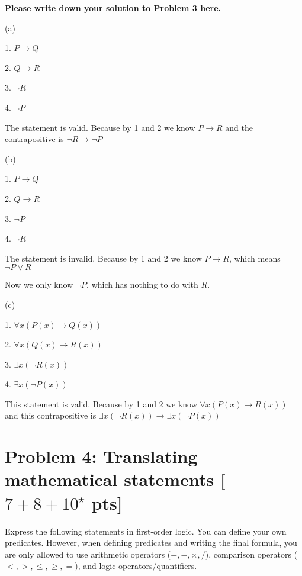 \documentclass[11pt,twoside]{article}
\newcommand{\problem}[1]{\section*{Problem #1}}
\newenvironment{solution}{{\par\noindent\it Solution.}}{}
\begin{document}
\begin{solution}
\textbf{Please write down your solution to Problem 3 here.}




    \hspace*{\fill}

    (a)
    
    1. $P\rightarrow Q$
    
    2. $Q\rightarrow R$

    3. $\neg R$

    4. $\neg P$



    The statement is valid. Because by 1 and 2 we know $P\rightarrow R$
and the contrapositive is $ \neg R\rightarrow \neg P$




    \hspace*{\fill}

    (b)
    
    1. $P\rightarrow Q$
    
    2. $Q\rightarrow R$

    3. $\neg P$

    4. $\neg R$



    The statement is invalid. Because by 1 and 2 we know $P\rightarrow R$, which means $\neg P \lor R$

    Now we only know $\neg P$, which has nothing to do with $R$.
    

    \hspace*{\fill}

    
    (c)

    1. $\forall x (P(x)\rightarrow Q(x))$


    2. $\forall x (Q(x)\rightarrow R(x))$

    3. $\exists x (\neg R(x))$

    4. $\exists x (\neg P(x))$


    This statement is valid. Because by 1 and 2 we know $\forall x (P(x)\rightarrow R(x))$ and this contrapositive is $\exists x (\neg R(x)) \rightarrow \exists x (\neg P(x))$









\end{solution}

\problem{4: Translating mathematical statements [$7+8+10^\star$ pts]}
Express the following statements in first-order logic.
You can define your own predicates.
However, when defining predicates and writing the final formula, you are only allowed to use arithmetic operators ($+,-,\times,/$), comparison operators ($<,>,\leq,\geq,=$), and logic operators/quantifiers.
\end{document}
